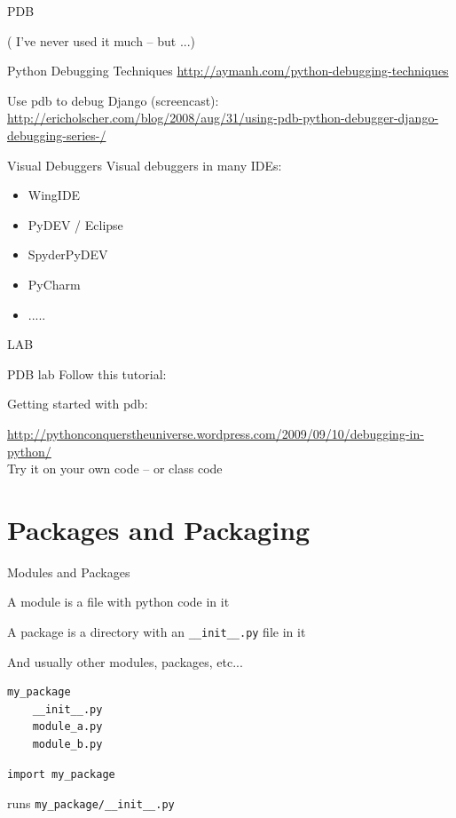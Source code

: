 \documentclass{beamer}
\begin{document}
\begin{frame}[fragile]{PDB}

( I've never used it much -- but ...)

\vfill
{\Large Python Debugging Techniques}
\url{http://aymanh.com/python-debugging-techniques}

\vfill
{\Large Use pdb to debug Django (screencast):}
\url{http://ericholscher.com/blog/2008/aug/31/using-pdb-python-debugger-django-debugging-series-/}
\end{frame} 

\begin{frame}[fragile]{Visual Debuggers}
\vfill
{\Large Visual debuggers in many IDEs:}
\begin{itemize}
  \item WingIDE
  \item PyDEV / Eclipse
  \item SpyderPyDEV
  \item PyCharm
  \item .....
\end{itemize}


\end{frame} 




\begin{frame}{LAB}

{\LARGE PDB lab}
\vfill
{\Large Follow this tutorial:}

\vfill
{\Large Getting started with pdb:}

\url{http://pythonconquerstheuniverse.wordpress.com/2009/09/10/debugging-in-python/}\\

\vfill
{\Large Try it on your own code -- or class code}

\vfill
\end{frame}


\section{Packages and Packaging}

\begin{frame}[fragile]{Modules and Packages}

\vfill
{\Large A module is a file with python code in it}

\vfill
{\Large A package is a directory with an \verb|__init__.py| file in it}

\vfill
{\Large And usually other modules, packages, etc...}

\begin{verbatim}
my_package
    __init__.py
    module_a.py
    module_b.py
\end{verbatim}

\begin{verbatim}
import my_package
\end{verbatim}

runs \verb|my_package/__init__.py|

\end{frame} 
\end{document}
